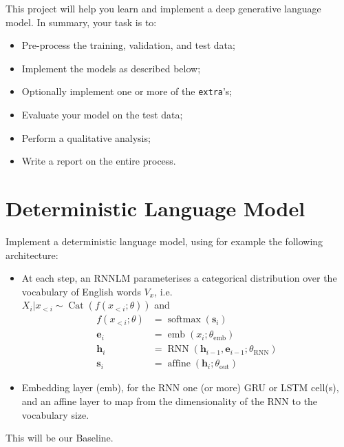
This project will help you learn and implement a deep generative language model.
In summary, your task is to:

\begin{itemize}
	\item Pre-process the training, validation, and test data;
	\item Implement the models as described below;
	\item Optionally implement one or more of the \texttt{extra}'s;
	\item Evaluate your model on the test data;
	\item Perform a qualitative analysis;
	\item Write a report on the entire process.
\end{itemize}


\section{Deterministic Language Model}

Implement a deterministic language model, using for example the following architecture:

\begin{itemize}
\item At each step, an RNNLM parameterises a categorical distribution over the vocabulary of English words $V_x$, i.e. \\
  $X_{i} | x_{<i} \sim \operatorname{Cat}\left(f\left(x_{<i} ; \theta\right)\right)$ and
 \begin{equation}
 \begin{aligned} 
 f\left(x_{<i} ; \theta\right) &= \operatorname{softmax}\left(\mathbf{s}_{i}\right) \\ \mathbf{e}_{i} &=\operatorname{emb}\left(x_{i} ; \theta_{\mathrm{emb}}\right) \\ \mathbf{h}_{i} &=\operatorname{RNN}\left(\mathbf{h}_{i-1}, \mathbf{e}_{i-1} ; \theta_{\mathrm{RNN}}\right) \\ \mathbf{s}_{i} &=\operatorname{affine}\left(\mathbf{h}_{i} ; \theta_{\mathrm{out}}\right)
  \end{aligned}
 \end{equation}
 \item  Embedding layer (emb), for the RNN one (or more)  GRU or LSTM cell(s), and an affine layer to map from the dimensionality of the RNN to the vocabulary size.
\end{itemize}

This will be our Baseline. 

